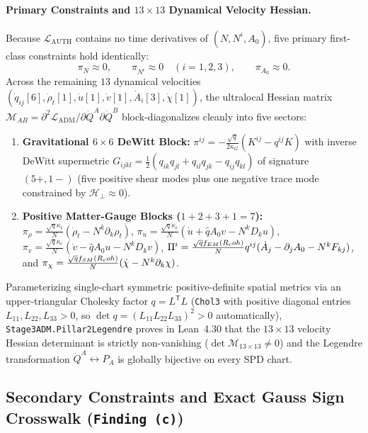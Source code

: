 \paragraph{Primary Constraints and $13\times 13$ Dynamical Velocity Hessian.}
Because $\mathcal{L}_{\mathrm{AUTH}}$ contains no time derivatives of $(N, N^i, A_0)$, five primary first-class constraints hold identically:
\begin{equation}
\pi_N \approx 0, \qquad \pi_{N^i} \approx 0 \quad (i=1,2,3), \qquad \pi_{A_0} \approx 0.
\label{eq:adm_primary_constraints}
\end{equation}
Across the remaining $13$ dynamical velocities $(\dot{q}_{ij}[6], \dot{\rho}_t[1], \dot{u}[1], \dot{v}[1], \dot{A}_i[3], \dot{\chi}[1])$, the ultralocal Hessian matrix $\mathcal{M}_{AB} = \partial^2\mathcal{L}_{\mathrm{ADM}}/\partial\dot{Q}^A\partial\dot{Q}^B$ block-diagonalizes cleanly into five sectors:
\begin{enumerate}[leftmargin=2em]
  \item \textbf{Gravitational $6\times 6$ DeWitt Block:} $\pi^{ij} = -\frac{\sqrt{q}}{2\kappa_G}(K^{ij} - q^{ij}K)$ with inverse DeWitt supermetric $G_{ijkl} = \frac{1}{2}(q_{ik}q_{jl} + q_{il}q_{jk} - q_{ij}q_{kl})$ of signature $(5+, 1-)$ (five positive shear modes plus one negative trace mode constrained by $\mathcal{H}_\perp \approx 0$).
  \item \textbf{Positive Matter-Gauge Blocks ($1 + 2 + 3 + 1 = 7$):} $\pi_\rho = \frac{\sqrt{q}\kappa_t}{N}(\dot{\rho}_t - N^k\partial_k\rho_t)$, $\pi_u = \frac{\sqrt{q}\kappa_c}{N}(\dot{u} + \hat{q}A_0 v - N^k D_k u)$, $\pi_v = \frac{\sqrt{q}\kappa_c}{N}(\dot{v} - \hat{q}A_0 u - N^k D_k v)$, $\Pi^i = \frac{\sqrt{q}f_{EM}(R_coh)}{N}q^{ij}(\dot{A}_j - \partial_j A_0 - N^k F_{kj})$, and $\pi_\chi = \frac{\sqrt{q}f_{SM}(R_coh)}{N}(\dot{\chi} - N^k\partial_k\chi)$.
\end{enumerate}
Parameterizing single-chart symmetric positive-definite spatial metrics via an upper-triangular Cholesky factor $q = L^{\mathsf{T}} L$ (\texttt{Chol3} with positive diagonal entries $L_{11}, L_{22}, L_{33} > 0$, so $\det q = (L_{11}L_{22}L_{33})^2 > 0$ automatically), \texttt{Stage3\allowbreak{}ADM.\allowbreak{}Pillar2\allowbreak{}Legendre} proves in Lean~4.30 that the $13\times 13$ velocity Hessian determinant is strictly non-vanishing ($\det\mathcal{M}_{13\times 13} \ne 0$) and the Legendre transformation $\dot{Q}^A \leftrightarrow P_A$ is globally bijective on every SPD chart.

\subsection{Secondary Constraints and Exact Gauss Sign Crosswalk (\texttt{Finding (c)})}

